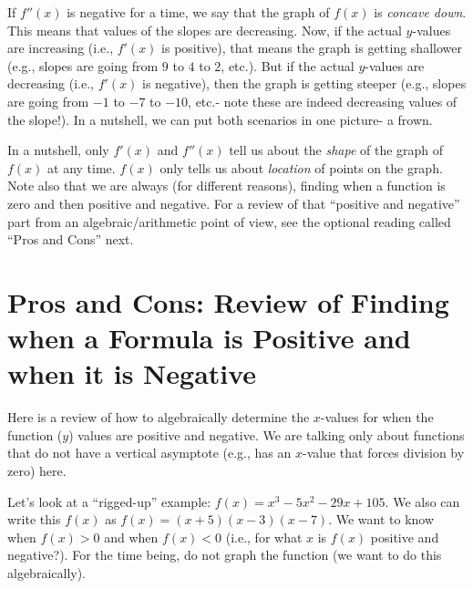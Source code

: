 \documentclass{ximera}
\begin{document}
If $f''(x)$ is negative for a time, we say that the graph of $f(x)$ is {\em concave down}.  This means that values of the slopes are decreasing.  Now, if the actual $y$-values are increasing (i.e., $f'(x)$ is positive), that means the graph is getting shallower (e.g., slopes are going from $9$ to $4$ to $2$, etc.).  But if the actual $y$-values are decreasing (i.e., $f'(x)$ is negative), then the graph is getting steeper (e.g., slopes are going from $-1$ to $-7$ to $-10$, etc.- note these are indeed decreasing values of the slope!).  In a nutshell, we can put both scenarios in one picture- a frown.

\begin{center}
\end{center}



In a nutshell, only $f'(x)$ and $f''(x)$ tell us about the {\em shape} of the graph of $f(x)$ at any time.  $f(x)$ only tells us about {\em location} of points on the graph.  Note also that we are always (for different reasons), finding when a function is zero and then positive and negative.  For a review of that ``positive and negative'' part from an algebraic/arithmetic point of view, see the optional reading called ``Pros and Cons'' next.

\section*{Pros and Cons: Review of Finding when a Formula is Positive and when it is Negative}

Here is a review of how to algebraically determine the $x$-values for when the function ($y$) values are positive and negative.  We are talking only about functions that do not have a vertical asymptote (e.g., has an $x$-value that forces division by zero) here.

Let's look at a ``rigged-up'' example: $f(x) = x^3-5x^2-29x+105$.  We also can write this $ f(x)$ as $f(x) = (x+5)(x-3)(x-7)$.  We want to know when $f(x) > 0$ and when $f(x) < 0$ (i.e., for what $x$ is $f(x)$ positive and negative?). For the time being, do not graph the function (we want to do this algebraically).
\end{document}
